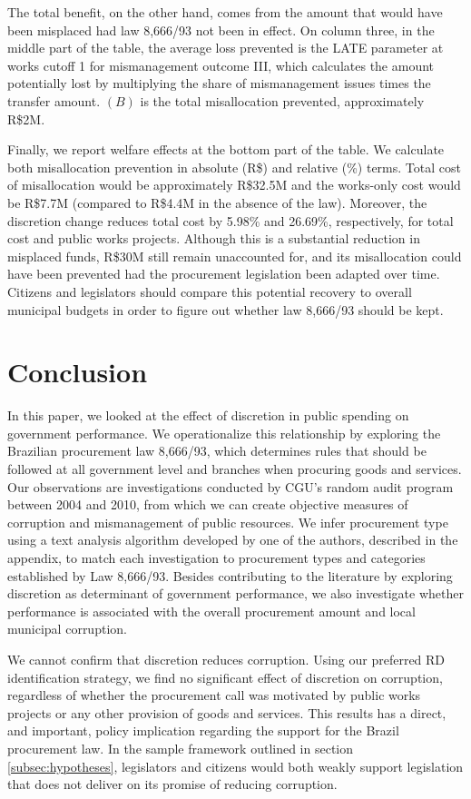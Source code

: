 \documentclass[11pt]{article}
\begin{document}
The total benefit, on the other hand, comes from the amount that would have been misplaced had law 8,666/93 not been in effect. On column three, in the middle part of the table, the average loss prevented is the LATE parameter at works cutoff 1 for mismanagement outcome III, which calculates the amount potentially lost by multiplying the share of mismanagement issues times the transfer amount. $(B)$ is the total misallocation prevented, approximately R\$2M.

Finally, we report welfare effects at the bottom part of the table. We calculate both misallocation prevention in absolute (R\$) and relative (\%) terms. Total cost of misallocation would be approximately R\$32.5M and the works-only cost would be R\$7.7M (compared to R\$4.4M in the absence of the law). Moreover, the discretion change reduces total cost by 5.98\% and 26.69\%, respectively, for total cost and public works projects. Although this is a substantial reduction in misplaced funds, R\$30M still remain unaccounted for, and its misallocation could have been prevented had the procurement legislation been adapted over time. Citizens and legislators should compare this potential recovery to overall municipal budgets in order to figure out whether law 8,666/93 should be kept.


\section{Conclusion} \label{sec:conclusion}

In this paper, we looked at the effect of discretion in public spending on government performance. We operationalize this relationship by exploring the Brazilian procurement law 8,666/93, which determines rules that should be followed at all government level and branches when procuring goods and services. Our observations are investigations conducted by CGU's random audit program between 2004 and 2010, from which we can create objective measures of corruption and mismanagement of public resources. We infer procurement type using a text analysis algorithm developed by one of the authors, described in the appendix, to match each investigation to procurement types and categories established by Law 8,666/93. Besides contributing to the literature by exploring discretion as determinant of government performance, we also investigate whether performance is associated with the overall procurement amount and local municipal corruption.

We cannot confirm that discretion reduces corruption. Using our preferred RD identification strategy, we find no significant effect of discretion on corruption, regardless of whether the procurement call was motivated by public works projects or any other provision of goods and services. This results has a direct, and important, policy implication regarding the support for the Brazil procurement law. In the sample framework outlined in section \ref{subsec:hypotheses}, legislators and citizens would both weakly support legislation that does not deliver on its promise of reducing corruption.
\end{document}
